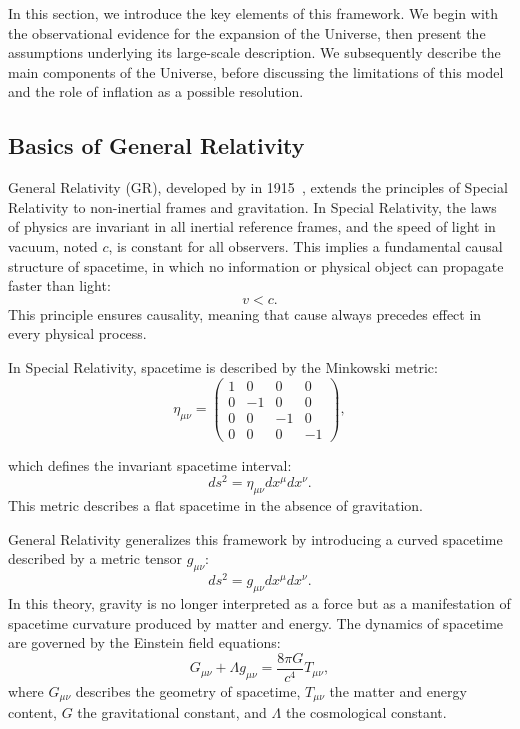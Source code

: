 \documentclass[../../thesis.tex]{subfiles}
\begin{document}
In this section, we introduce the key elements of this framework. We begin with the observational evidence for the expansion of the Universe, then present the assumptions underlying its large-scale description. We subsequently describe the main components of the Universe, before discussing the limitations of this model and the role of inflation as a possible resolution.


\subsection{Basics of General Relativity}

General Relativity (GR), developed by \citeauthor{einstein1916_general_relativity} in 1915~\cite{einstein1916_general_relativity}, extends the principles of Special Relativity to non-inertial frames and gravitation. In Special Relativity, the laws of physics are invariant in all inertial reference frames, and the speed of light in vacuum, noted $c$, is constant for all observers. This implies a fundamental causal structure of spacetime, in which no information or physical object can propagate faster than light:
\[v < c.\]
This principle ensures causality, meaning that cause always precedes effect in every physical process.

In Special Relativity, spacetime is described by the Minkowski metric:
\begin{equation}
    \eta_{\mu\nu} = 
    \begin{pmatrix}
    1 & 0 & 0 & 0 \\
    0 & -1 & 0 & 0 \\
    0 & 0 & -1 & 0 \\
    0 & 0 & 0 & -1
    \end{pmatrix},
\end{equation}

which defines the invariant spacetime interval:
\[ds^2 = \eta_{\mu\nu} dx^\mu dx^\nu.\]
This metric describes a flat spacetime in the absence of gravitation.

General Relativity generalizes this framework by introducing a curved spacetime described by a metric tensor $g_{\mu\nu}$:
\[ds^2 = g_{\mu\nu} dx^\mu dx^\nu.\]
In this theory, gravity is no longer interpreted as a force but as a manifestation of spacetime curvature produced by matter and energy. The dynamics of spacetime are governed by the Einstein field equations:
\[G_{\mu\nu} + \Lambda g_{\mu\nu}=
\frac{8\pi G}{c^4} T_{\mu\nu},
\]
where $G_{\mu\nu}$ describes the geometry of spacetime, $T_{\mu\nu}$ the matter and energy content, $G$ the gravitational constant, and $\Lambda$ the cosmological constant.
\end{document}
